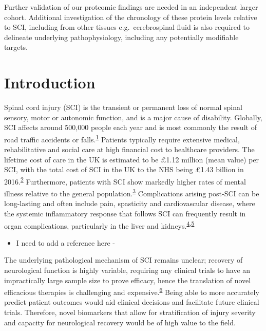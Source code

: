 \documentclass[
]{article}
\providecommand{\tightlist}{%
  \setlength{\itemsep}{0pt}\setlength{\parskip}{0pt}}
\begin{document}
Further validation of our proteomic findings are needed in an independent larger cohort.
Additional investigation of the chronology of these protein levels relative to SCI, including from other tissues e.g.~cerebrospinal fluid is also required to delineate underlying pathophysiology, including any potentially modifiable targets.

\hypertarget{introduction}{%
\section{Introduction}\label{introduction}}

Spinal cord injury (SCI) is the transient or permanent loss of normal spinal sensory, motor or autonomic function, and is a major cause of disability. Globally, SCI affects around 500,000 people each year and is most commonly the result of road traffic accidents or falls.\textsuperscript{\protect\hyperlink{ref-crozier-shaw_management_2020}{1}}
Patients typically require extensive medical, rehabilitative and social care at high financial cost to healthcare providers. The lifetime cost of care in the UK is estimated to be £1.12 million (mean value) per SCI, with the total cost of SCI in the UK to the NHS being £1.43 billion in 2016.\textsuperscript{\protect\hyperlink{ref-mcdaid_understanding_2019}{2}}
Furthermore, patients with SCI show markedly higher rates of mental illness relative to the general population.\textsuperscript{\protect\hyperlink{ref-furlan_health_2017}{3}}
Complications arising post-SCI can be long-lasting and often include pain, spasticity and cardiovascular disease, where the systemic inflammatory response that follows SCI can frequently result in organ complications, particularly in the liver and kidneys.\textsuperscript{\protect\hyperlink{ref-gris_systemic_2008}{4},\protect\hyperlink{ref-sun_multiple_2016}{5}}

\begin{itemize}
\tightlist
\item
  I need to add a reference here -
\end{itemize}

The underlying pathological mechanism of SCI remains unclear; recovery of neurological function is highly variable, requiring any clinical trials to have an impractically large sample size to prove efficacy, hence the translation of novel efficacious therapies is challenging and expensive.\textsuperscript{\protect\hyperlink{ref-spiess_conversion_2009}{6}}
Being able to more accurately predict patient outcomes would aid clinical decisions and facilitate future clinical trials. Therefore, novel biomarkers that allow for stratification of injury severity and capacity for neurological recovery would be of high value to the field.
\end{document}
